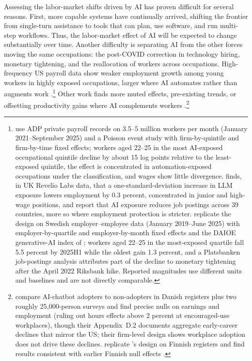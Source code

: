 \documentclass[12pt]{article}
\begin{document}
Assessing the labor-market shifts driven by AI has proven difficult for several reasons. First, more capable systems have continually arrived, shifting the frontier from single-turn assistance to tools that can plan, use software, and run multi-step workflows. Thus, the labor-market effect of AI will be expected to change substantially over time. Another difficulty is separating AI from the other forces moving the same occupations: the post-COVID correction in technology hiring, monetary tightening, and the reallocation of workers across occupations. High-frequency US payroll data show weaker employment growth among young workers in highly exposed occupations, larger where AI automates rather than augments work \citep{brynjolfsson2025}.\footnote{\citet{brynjolfsson2025} use ADP private payroll records on 3.5--5 million workers per month (January 2021--September 2025) and a Poisson event study with firm-by-quintile and firm-by-time fixed effects; workers aged 22--25 in the most AI-exposed occupational quintile decline by about 15 log points relative to the least-exposed quintile, the effect is concentrated in automation-exposed occupations under the \citet{handa2025} classification, and wages show little divergence. \citet{teeselink2025} finds, in UK Revelio Labs data, that a one-standard-deviation increase in LLM exposure lowers employment by 0.3 percent, concentrated in junior and high-wage positions, and \citet{teeselink2026} report that AI exposure reduces job postings across 39 countries, more so where employment protection is stricter. \citet{lodefalk2026} replicate the design on Swedish employer--employee data (January 2019--June 2025) with employer-by-quartile and employer-by-month fixed effects and the DAIOE generative-AI index of \citet{engberg2024}; workers aged 22--25 in the most-exposed quartile fall 5.5 percent by 2025H1 while the oldest gain 1.3 percent, and a Platsbanken job-postings analysis attributes part of the decline to monetary tightening after the April 2022 Riksbank hike. Reported magnitudes use different units and baselines and are not directly comparable.} Other work finds more muted effects, pre-existing trends, or offsetting productivity gains where AI complements workers \citep{humlum2026, kauhanen2026}.\footnote{\citet{humlum2026} compare AI-chatbot adopters to non-adopters in Danish registers plus two roughly 25,000-person surveys and find precise nulls on earnings and employment (ruling out hours effects above 2 percent at encouraged-use workplaces), though their Appendix~D.2 documents aggregate early-career declines that mirror the US; their firm-level design shows workplace adoption does not drive these declines. \citet{kauhanen2026} replicate \citet{brynjolfsson2025}'s design on Finnish registers and find results consistent with earlier Finnish null effects \citep{kauhanen2024, kauhanen2025}.} 
\end{document}
